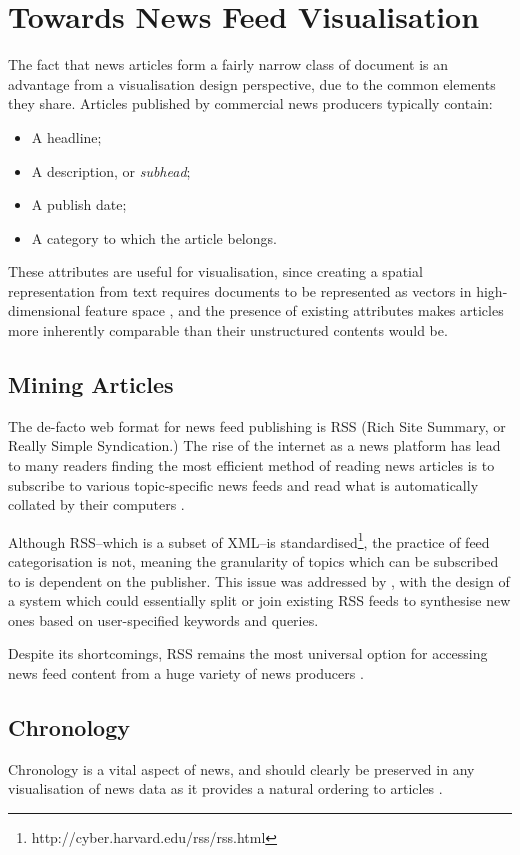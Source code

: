 \section{Towards News Feed Visualisation}

The fact that news articles form a fairly narrow class of document is an advantage from a visualisation design perspective, due to the common elements they share. Articles published by commercial news producers typically contain:
\begin{itemize}[noitemsep]
	\item A headline;
	\item A description, or \textit{subhead};
	\item A publish date;
	\item A category to which the article belongs.
\end{itemize}
These attributes are useful for visualisation, since creating a spatial representation from text requires documents to be represented as vectors in high-dimensional feature space \citep{VisualizingTheNonVisual}, and the presence of existing attributes makes articles more inherently comparable than their unstructured contents would be. 

\subsection{Mining Articles}
The de-facto web format for news feed publishing is RSS (Rich Site Summary, or Really Simple Syndication.) The rise of the internet as a news platform has lead to many readers finding the most efficient method of reading news articles is to subscribe to various topic-specific news feeds and read what is automatically collated by their computers \citep{Nreader}.

Although RSS--which is a subset of XML--is standardised\footnote{http://cyber.harvard.edu/rss/rss.html}, the practice of feed categorisation is not, meaning the granularity of topics which can be subscribed to is dependent on the publisher. This issue was addressed by \citet{PersonalNewsRss}, with the design of a system which could essentially split or join existing RSS feeds to synthesise new ones based on user-specified keywords and queries.

Despite its shortcomings, RSS remains the most universal option for accessing news feed content from a huge variety of news producers 
\citep{MiningAndVisualisingInformationFromRSSFeeds}. 
\subsection{Chronology}
Chronology is a vital aspect of news, and should clearly be preserved in any visualisation of news data as it provides a natural ordering to articles \citep{StructuredSummarizationForNewsEvents}.

